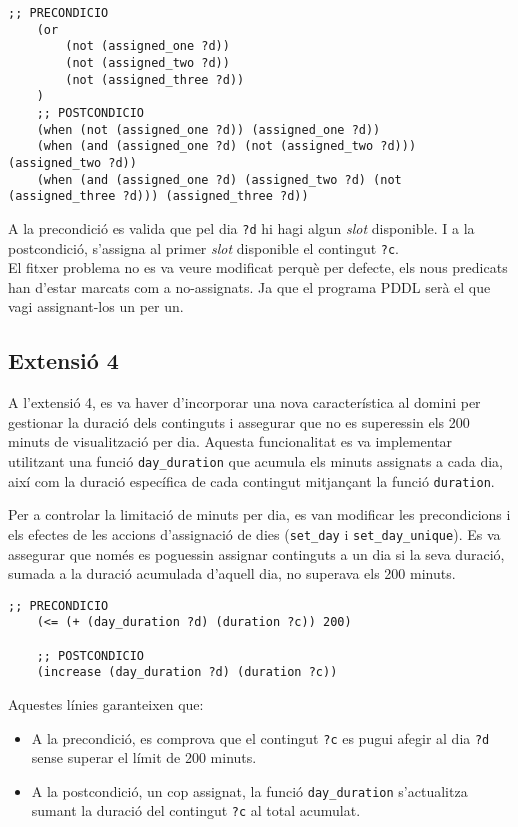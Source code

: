 \documentclass[a4paper]{article}
\begin{document}
	\begin{lstlisting}[language=PDDL, caption={Fragment per limitar a 3 els continguts per dia}, label={lst:extensio3}]
	;; PRECONDICIO	
	(or 
		(not (assigned_one ?d))
		(not (assigned_two ?d))
		(not (assigned_three ?d))
	)
	;; POSTCONDICIO
	(when (not (assigned_one ?d)) (assigned_one ?d))
	(when (and (assigned_one ?d) (not (assigned_two ?d))) (assigned_two ?d))
	(when (and (assigned_one ?d) (assigned_two ?d) (not (assigned_three ?d))) (assigned_three ?d))
	\end{lstlisting}
	
	A la precondició es valida que pel dia \texttt{?d} hi hagi algun \textit{slot} disponible. I a la postcondició, s'assigna al primer \textit{slot} disponible el contingut \texttt{?c}. \\
	
	El fitxer problema no es va veure modificat perquè per defecte, els nous predicats han d'estar marcats com a no-assignats. Ja que el programa PDDL serà el que vagi assignant-los un per un.

	\subsection{Extensió 4}
	
	A l'extensió 4, es va haver d'incorporar una nova característica al domini per gestionar la duració dels continguts i assegurar que no es superessin els 200 minuts de visualització per dia. Aquesta funcionalitat es va implementar utilitzant una funció \texttt{day\_duration} que acumula els minuts assignats a cada dia, així com la duració específica de cada contingut mitjançant la funció \texttt{duration}.
	
	Per a controlar la limitació de minuts per dia, es van modificar les precondicions i els efectes de les accions d'assignació de dies (\texttt{set\_day} i \texttt{set\_day\_unique}). Es va assegurar que només es poguessin assignar continguts a un dia si la seva duració, sumada a la duració acumulada d'aquell dia, no superava els 200 minuts.
	
	\begin{lstlisting}[language=PDDL, caption={Restriccions per controlar el límit de 200 minuts per dia}, label={lst:extensio4}]
	;; PRECONDICIO
	(<= (+ (day_duration ?d) (duration ?c)) 200)
	
	;; POSTCONDICIO
	(increase (day_duration ?d) (duration ?c))
	\end{lstlisting}
	
	Aquestes línies garanteixen que:
	\begin{itemize}
		\item A la precondició, es comprova que el contingut \texttt{?c} es pugui afegir al dia \texttt{?d} sense superar el límit de 200 minuts.
		\item A la postcondició, un cop assignat, la funció \texttt{day\_duration} s'actualitza sumant la duració del contingut \texttt{?c} al total acumulat.
	\end{itemize}
	
\end{document}
